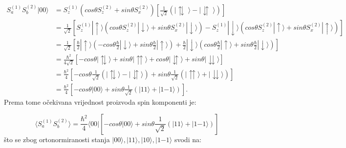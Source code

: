 \begin{equation}
    \begin{aligned}
        S_a^{(1)}S_b^{(2)} | 00 \rangle & = S_z^{(1)}\left(cos{\theta} S_z^{(2)} + sin{\theta} S_x^{(2)}\right) \left[\frac{1}{\sqrt2}(| \updownarrows \; \rangle - | \downuparrows \; \rangle)\right]                                                                                                                                                                  \\[1ex]
                                        & = \frac{1}{\sqrt{2}} \left[ S_z^{(1)}|\uparrow\rangle \left( cos{\theta} S_z^{(2)}|\downarrow\rangle + sin{\theta} S_x^{(2)}|\downarrow\rangle \right) - S_z^{(1)}|\downarrow\rangle \left( cos{\theta} S_z^{(2)}|\uparrow\rangle + sin{\theta} S_x^{(2)}|\uparrow\rangle \right) \right]                                     \\[1ex]
                                        & = \frac{1}{\sqrt{2}} \left[ \frac{\hbar}{2}|\uparrow\rangle \left( -cos{\theta}\frac{\hbar}{2}|\downarrow\rangle + sin{\theta} \frac{\hbar}{2}|\uparrow\rangle \right) + \frac{\hbar}{2}|\downarrow\rangle \left( cos{\theta} \frac{\hbar}{2}|\uparrow\rangle + sin{\theta} \frac{\hbar}{2}|\downarrow\rangle \right) \right] \\[1ex]
                                        & = \frac{\hbar^2}{4\sqrt{2}} \left[ -cos{\theta} |\updownarrows\rangle + sin{\theta}|\upuparrows\rangle + cos{\theta} |\downuparrows\rangle + sin{\theta}|\downdownarrows\rangle \right]                                                                                                                                       \\[1ex]
                                        & = \frac{\hbar^2}{4} \left[ - cos{\theta} \frac{1}{\sqrt{2}} \left( |\updownarrows\rangle -  |\downuparrows\rangle \right) + sin{\theta} \frac{1}{\sqrt{2}} \left( |\upuparrows\rangle + |\downdownarrows\rangle \right) \right]                                                                                               \\[1ex]
                                        & = \frac{\hbar^2}{4} \left[ - cos{\theta}|00\rangle + sin{\theta} \frac{1}{\sqrt{2}} \left( | 11 \rangle + | 1 {-1} \rangle \right) \right].
    \end{aligned}
\end{equation}
Prema tome očekivana vrijednost proizvoda spin komponenti je:

\begin{equation}
    \langle  S_a^{(1)}S_b^{(2)} \rangle = \frac{\hbar^2}{4} \langle 00 | \left[ - cos{\theta}|00\rangle + sin{\theta} \frac{1}{\sqrt{2}} \left( | 11 \rangle + | 1 {-1} \rangle \right) \right]
\end{equation}
što se zbog ortonormiranosti stanja $| 00 \rangle,| 11 \rangle,| 10 \rangle,| 1{-1}\rangle$ svodi na:

